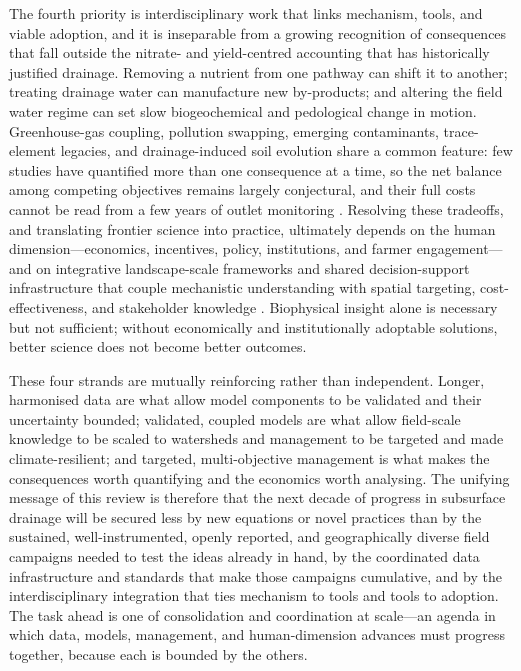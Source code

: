 The fourth priority is interdisciplinary work that links mechanism, tools,
and viable adoption, and it is inseparable from a growing recognition of
consequences that fall outside the nitrate- and yield-centred accounting
that has historically justified drainage. Removing a nutrient from one
pathway can shift it to another; treating drainage water can manufacture new
by-products; and altering the field water regime can set slow biogeochemical
and pedological change in motion. Greenhouse-gas coupling, pollution
swapping, emerging contaminants, trace-element legacies, and
drainage-induced soil evolution share a common feature: few studies have
quantified more than one consequence at a time, so the net balance among
competing objectives remains largely conjectural, and their full costs
cannot be read from a few years of outlet monitoring \parencite{Mitchell2023,Kadlec2012}. Resolving these
tradeoffs, and translating frontier science into practice, ultimately
depends on the human dimension---economics, incentives, policy,
institutions, and farmer engagement---and on integrative landscape-scale
frameworks and shared decision-support infrastructure that couple mechanistic
understanding with spatial targeting, cost-effectiveness, and stakeholder
knowledge \parencite{McLellan2015,Christianson2014}. Biophysical insight alone is necessary but not sufficient; without
economically and institutionally adoptable solutions, better science does not
become better outcomes.

These four strands are mutually reinforcing rather than independent.
Longer, harmonised data are what allow model components to be validated and
their uncertainty bounded; validated, coupled models are what allow
field-scale knowledge to be scaled to watersheds and management to be
targeted and made climate-resilient; and targeted, multi-objective
management is what makes the consequences worth quantifying and the
economics worth analysing. The unifying message of this review is therefore
that the next decade of progress in subsurface drainage will be secured less
by new equations or novel practices than by the sustained, well-instrumented,
openly reported, and geographically diverse field campaigns needed to test
the ideas already in hand, by the coordinated data infrastructure and
standards that make those campaigns cumulative, and by the interdisciplinary
integration that ties mechanism to tools and tools to adoption. The task
ahead is one of consolidation and coordination at scale---an agenda in which
data, models, management, and human-dimension advances must progress
together, because each is bounded by the others.